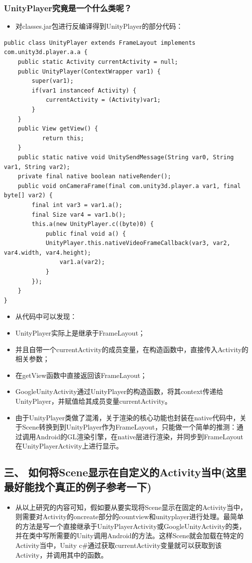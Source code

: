 \documentclass[9pt, b5paper]{article}
\begin{document}
\subsubsection{UnityPlayer究竟是一个什么类呢？}
\label{sec-2-2-4}
\begin{itemize}
\item 对classes.jar包进行反编译得到UnityPlayer的部分代码：
\end{itemize}
\begin{verbatim}
public class UnityPlayer extends FrameLayout implements com.unity3d.player.a.a {
    public static Activity currentActivity = null;
    public UnityPlayer(ContextWrapper var1) {
        super(var1);
        if(var1 instanceof Activity) {
            currentActivity = (Activity)var1;
        }
    }
    public View getView() {
           return this;
    }
    public static native void UnitySendMessage(String var0, String var1, String var2);
    private final native boolean nativeRender();
    public void onCameraFrame(final com.unity3d.player.a var1, final byte[] var2) {
        final int var3 = var1.a();
        final Size var4 = var1.b();
        this.a(new UnityPlayer.c((byte)0) {
            public final void a() {
            UnityPlayer.this.nativeVideoFrameCallback(var3, var2, var4.width, var4.height);
                var1.a(var2);
            }
        });
    }
}
\end{verbatim}
\begin{itemize}
\item 从代码中可以发现：
\item UnityPlayer实际上是继承于FrameLayout；
\item 并且自带一个currentActivity的成员变量，在构造函数中，直接传入Activity的相关参数；
\item 在getView函数中直接返回该FrameLayout；
\item GoogleUnityActivity通过UnityPlayer的构造函数，将其context传递给UnityPlayer，并赋值给其成员变量currentActivity。
\item 由于UnityPlayer类做了混淆，关于渲染的核心功能也封装在native代码中，关于Scene转换到到UnityPlayer作为FrameLayout，只能做一个简单的推测：通过调用Android的GL渲染引擎，在native层进行渲染，并同步到FrameLayout在UnityPlayerActivity上进行显示。
\end{itemize}
\subsection{三、 如何将Scene显示在自定义的Activity当中(这里最好能找个真正的例子参考一下)}
\label{sec-2-3}
\begin{itemize}
\item 从以上研究的内容可知，假如要从要实现将Scene显示在固定的Activity当中，则需要对Activity的oncreate部分的countview和unityplayer进行处理。最简单的方法是写一个直接继承于UnityPlayerActivity或GoogleUnityActivity的类，并在类中写所需要的Unity调用Android的方法。这样Scene就会加载在特定的Activity当中，Unity c\#通过获取currentActivity变量就可以获取到该Activity，并调用其中的函数。
\end{itemize}
\end{document}
